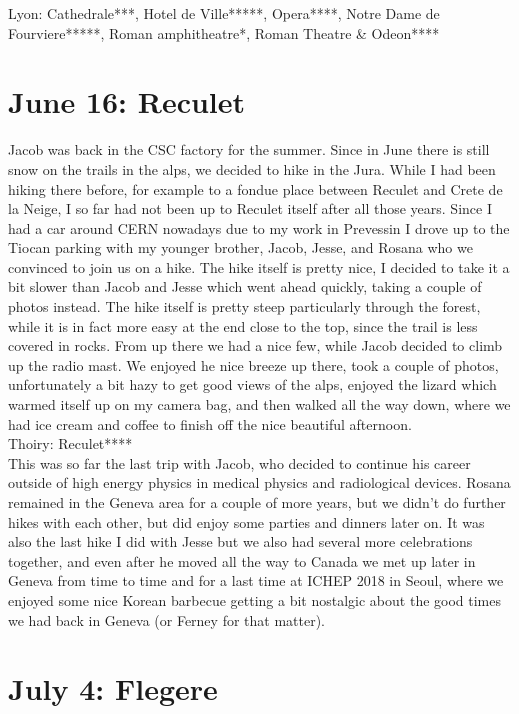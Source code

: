 Lyon: Cathedrale***, Hotel de Ville*****, Opera****, Notre Dame de Fourviere*****, Roman amphitheatre*, Roman Theatre \& Odeon****\\

\section{June 16: Reculet}
\label{Reculet2013}

Jacob was back in the CSC factory for the summer. Since in June there is still snow on the trails in the alps, we decided to hike in the Jura. While I had been hiking there before, for example to a fondue place between Reculet and Crete de la Neige, I so far had not been up to Reculet itself after all those years. Since I had a car around CERN nowadays due to my work in Prevessin I drove up to the Tiocan parking with my younger brother, Jacob, Jesse, and Rosana who we convinced to join us on a hike. The hike itself is pretty nice, I decided to take it a bit slower than Jacob and Jesse which went ahead quickly, taking a couple of photos instead. The hike itself is pretty steep particularly through the forest, while it is in fact more easy at the end close to the top, since the trail is less covered in rocks. From up there we had a nice few, while Jacob decided to climb up the radio mast. We enjoyed he nice breeze up there, took a couple of photos, unfortunately a bit hazy to get good views of the alps, enjoyed the lizard which warmed itself up on my camera bag, and then walked all the way down, where we had ice cream and coffee to finish off the nice beautiful afternoon.\\

Thoiry: Reculet****\\

This was so far the last trip with Jacob, who decided to continue his career outside of high energy physics in medical physics and radiological devices. Rosana remained in the Geneva area for a couple of more years, but we didn't do further hikes with each other, but did enjoy some parties and dinners later on. It was also the last hike I did with Jesse but we also had several more celebrations together, and even after he moved all the way to Canada we met up later in Geneva from time to time and for a last time at ICHEP 2018 in Seoul, where we enjoyed some nice Korean barbecue getting a bit nostalgic about the good times we had back in Geneva (or Ferney for that matter).

\section{July 4: Flegere}
\label{Flegere2013}

